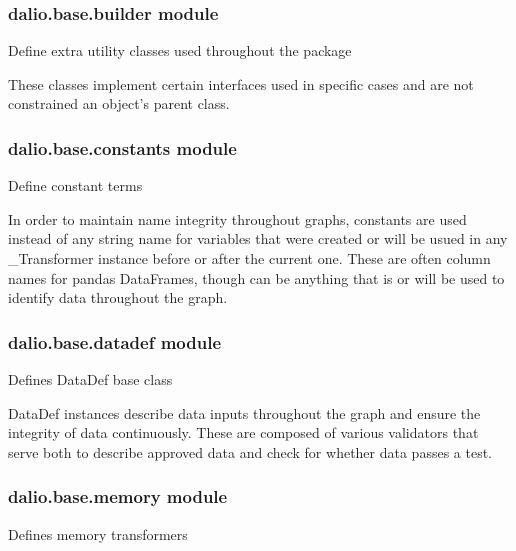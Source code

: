 \documentclass[letterpaper,10pt,english]{sphinxmanual}
\begin{document}
\subsubsection{dalio.base.builder module}
\label{\detokenize{dalio.base:module-dalio.base.builder}}\label{\detokenize{dalio.base:dalio-base-builder-module}}
Define extra utility classes used throughout the package

These classes implement certain interfaces used in specific cases and are not
constrained an object’s parent class.


\subsubsection{dalio.base.constants module}
\label{\detokenize{dalio.base:module-dalio.base.constants}}\label{\detokenize{dalio.base:dalio-base-constants-module}}
Define constant terms

In order to maintain name integrity throughout graphs, constants are used
instead of any string name for variables that were created or will be usued in
any \_Transformer instance before or after the current one. These are often
column names for pandas DataFrames, though can be anything that is or will be
used to identify data throughout the graph.


\subsubsection{dalio.base.datadef module}
\label{\detokenize{dalio.base:module-dalio.base.datadef}}\label{\detokenize{dalio.base:dalio-base-datadef-module}}
Defines DataDef base class

DataDef instances describe data inputs throughout the graph and ensure the
integrity of data continuously. These are composed of various validators that
serve both to describe approved data and check for whether data passes a test.


\subsubsection{dalio.base.memory module}
\label{\detokenize{dalio.base:module-dalio.base.memory}}\label{\detokenize{dalio.base:dalio-base-memory-module}}
Defines memory transformers
\end{document}
